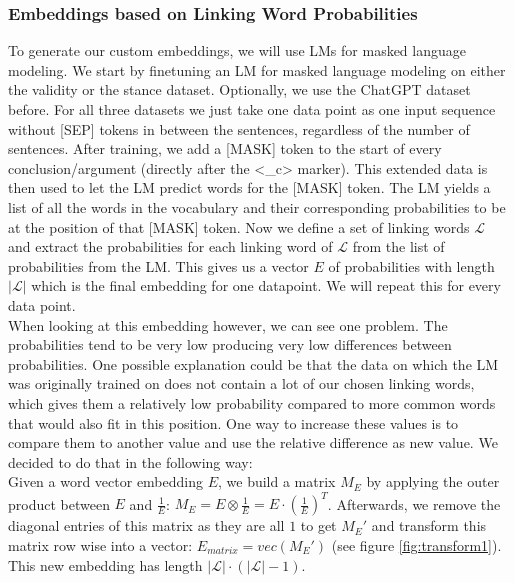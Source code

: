 \subsubsection{Embeddings based on Linking Word Probabilities} \label{sec:linkingembeddings}
To generate our custom embeddings, we will use LMs for masked language modeling. We start by finetuning an LM for masked language modeling \cite{bertmask} on either the validity or the stance dataset. Optionally, we use the ChatGPT dataset before. For all three datasets we just take one data point as one input sequence without [SEP] tokens in between the sentences, regardless of the number of sentences. After training, we add a [MASK] token to the start of every conclusion/argument (directly after the <\_c> marker). This extended data is then used to let the LM predict words for the [MASK] token. The LM yields a list of all the words in the vocabulary and their corresponding probabilities to be at the position of that [MASK] token. Now we define a set of linking words $\mathcal{L}$ and extract the probabilities for each linking word of $\mathcal{L}$ from the list of probabilities from the LM. This gives us a vector $E$ of probabilities with length $|\mathcal{L}|$ which is the final embedding for one datapoint. We will repeat this for every data point. \\

When looking at this embedding however, we can see one problem. The probabilities tend to be very low producing very low differences between probabilities. One possible explanation could be that the data on which the LM was originally trained on does not contain a lot of our chosen linking words, which gives them a relatively low probability compared to more common words that would also fit in this position. One way to increase these values is to compare them to another value and use the relative difference as new value. We decided to do that in the following way: \\
Given a word vector embedding $E$, we build a matrix $M_E$ by applying the outer product between $E$ and $\frac{1}{E}$: $M_E = E \otimes \frac{1}{E} = E \cdot (\frac{1}{E})^T$.
Afterwards, we remove the diagonal entries of this matrix as they are all $1$ to get $M_E'$ and transform this matrix row wise into a vector: $E_{matrix} = vec(M_E')$ (see figure \ref{fig:transform1}). This new embedding has length $|\mathcal{L}| \cdot (|\mathcal{L}|-1)$.


